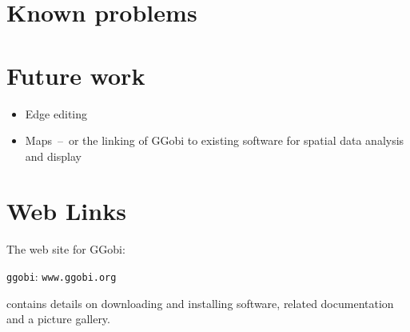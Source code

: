 \documentclass[11pt]{article}
\begin{document}
\section{Known problems}


\section{Future work}

\begin{itemize}
\item Edge editing
\item Maps~--~or the linking of GGobi to existing software for
  spatial data analysis and display
\end{itemize}

\section*{Web Links}

The web site for GGobi:

\centerline{{\tt ggobi}: {\tt www.ggobi.org}}

contains details on downloading and installing software, related
documentation and a picture gallery.

\newpage

\end{document}
